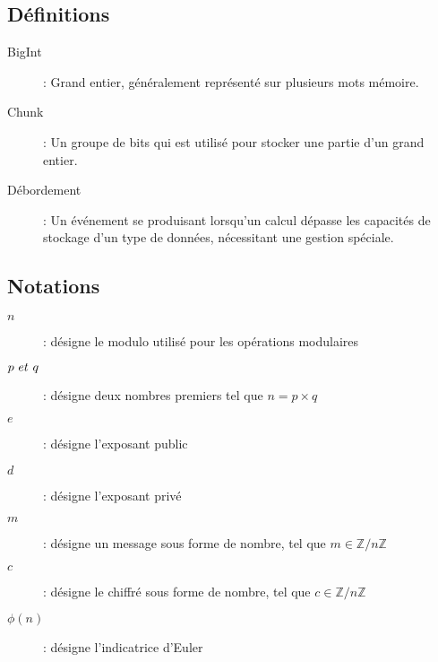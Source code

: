\subsection{Définitions}
\begin{description}
    \item[BigInt] : Grand entier, généralement représenté sur plusieurs mots mémoire.
    \item[Chunk] : Un groupe de bits qui est utilisé pour stocker une partie d'un grand entier.
    \item[Débordement] : Un événement se produisant lorsqu'un calcul dépasse les capacités de stockage d'un type de données, nécessitant une gestion spéciale.
\end{description}

\subsection{Notations}
\begin{description}
    \item[$n$] : désigne le modulo utilisé pour les opérations modulaires
    \item[$p~\normalfont{et}~q$] : désigne deux nombres premiers tel que $n = p \times q$
    \item[$e$] : désigne l'exposant public
    \item[$d$] : désigne l'exposant privé
    \item[$m$] : désigne un message sous forme de nombre, tel que $m \in \mathbb{Z}/n\mathbb{Z}$
    \item[$c$] : désigne le chiffré sous forme de nombre, tel que $c \in \mathbb{Z}/n\mathbb{Z}$
    \item[$\phi(n)$] : désigne l'indicatrice d'Euler
\end{description}

